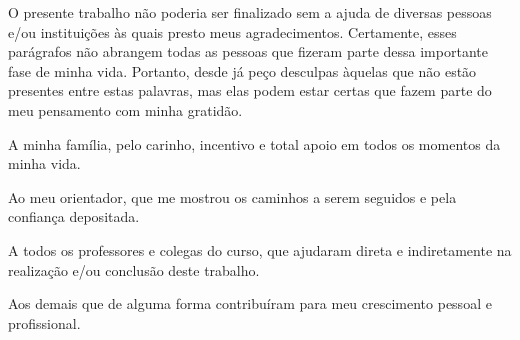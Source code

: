 
\begin{Acknowledgments}%
O presente trabalho não poderia ser finalizado sem a ajuda de diversas pessoas e/ou instituições às quais presto meus agradecimentos.
Certamente, esses parágrafos não abrangem todas as pessoas que fizeram parte dessa importante fase de minha vida.
Portanto, desde já peço desculpas àquelas que não estão presentes entre estas palavras, mas elas podem estar certas que fazem parte do meu pensamento com minha gratidão.\par%
A minha família, pelo carinho, incentivo e total apoio em todos os momentos da minha vida.\par%
Ao meu orientador, que me mostrou os caminhos a serem seguidos e pela confiança depositada.\par%
A todos os professores e colegas do curso, que ajudaram direta e indiretamente na realização e/ou conclusão deste trabalho.\par%
Aos demais que de alguma forma contribuíram para meu crescimento pessoal e profissional.\par%
\end{Acknowledgments}
